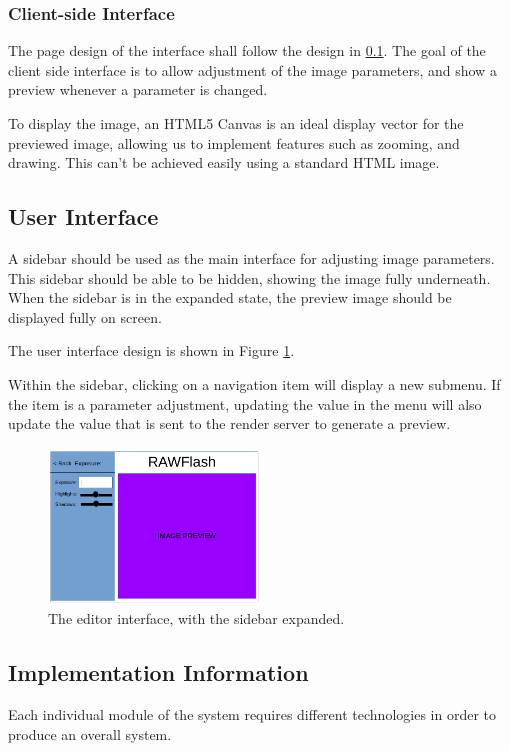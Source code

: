 \documentclass[12pt,a4paper]{article}
\begin{document}
\subsubsection{Client-side Interface}
  The page design of the interface shall follow the design in \ref{UserInterface}.
  The goal of the client side interface is to allow adjustment of the image parameters, and show a preview whenever a parameter is changed.

  To display the image, an HTML5 Canvas is an ideal display vector for the previewed image, allowing us to implement features such as zooming, and drawing. This can't be achieved easily using a standard HTML image.

\subsection{User Interface}\label{UserInterface}
  A sidebar should be used as the main interface for adjusting image parameters.
  This sidebar should be able to be hidden, showing the image fully underneath.
  When the sidebar is in the expanded state, the preview image should be displayed
  fully on screen.

  The user interface design is shown in Figure \ref{UXDesign1}.

  Within the sidebar, clicking on a navigation item will display a new submenu.
  If the item is a parameter adjustment, updating the value in the menu will also update the value that is sent to the render server to generate a preview.
%
  \begin{figure}[h]\label{UXDesign1}
    \centering
    \includegraphics[width=0.5\textwidth]{uxdesign1}
    \caption{The editor interface, with the sidebar expanded.}

  \end{figure}

\subsection{Implementation Information}
Each individual module of the system requires different technologies in order to
produce an overall system.
\end{document}

